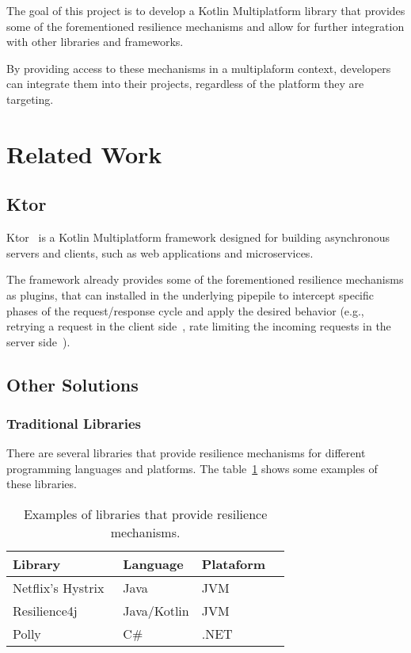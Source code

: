 The goal of this project is to develop a Kotlin Multiplatform library that provides some of the forementioned resilience mechanisms and allow for further integration with other libraries and frameworks.

By providing access to these mechanisms in a multiplaform context, developers can integrate them into their projects, regardless of the platform they are targeting.


\section{Related Work}\label{sec:related-work}

\subsection{Ktor}\label{subsec:ktor}
Ktor~\cite{ktor} is a Kotlin Multiplatform framework designed for building asynchronous servers and clients, such as web applications and microservices.

The framework already provides some of the forementioned resilience mechanisms as plugins, that can installed in the underlying pipepile to intercept specific phases of the request/response cycle and apply the desired behavior (e.g., retrying a request in the client side~\cite{ktor-client-retry}, rate limiting the incoming requests in the server side~\cite{ktor-server-rate-limit}).

\subsection{Other Solutions}\label{subsec:other-solutions}

\subsubsection{Traditional Libraries}

There are several libraries that provide resilience mechanisms for different programming languages and platforms.
The table~\ref{tab:resilience_libraries} shows some examples of these libraries.

\begin{table}[h!]
    \centering
    \caption{Examples of libraries that provide resilience mechanisms.}
    \label{tab:resilience_libraries}
    \vspace{0.3cm}
    \begin{tabular}{|l|l|l|l|}
        \hline
        \textbf{Library}                         & \textbf{Language} & \textbf{Plataform} \\ \hline
        Netflix's Hystrix~\cite{netflix-hystrix} & Java              & JVM                \\ \hline
        Resilience4j~\cite{resilience4j}         & Java/Kotlin       & JVM                \\ \hline
        Polly ~\cite{polly-dotnet}               & C\#               & .NET               \\
        \hline
    \end{tabular}
\end{table}


